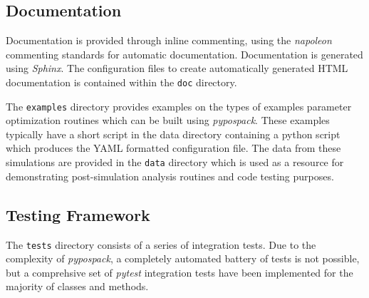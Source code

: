 \subsection{Documentation}

Documentation is provided through inline commenting, using the \emph{napoleon} commenting standards for automatic documentation.  Documentation is generated using \emph{Sphinx}.  The configuration files to create automatically generated HTML documentation is contained within the \verb|doc| directory.

The \verb|examples| directory provides examples on the types of examples parameter optimization routines which can be built using \emph{pypospack}.  These examples typically have a short script in the data directory containing a python script which produces the YAML formatted configuration file.  The data from these simulations are provided in the \verb|data| directory which is used as a resource for demonstrating post-simulation analysis routines and code testing purposes.

\subsection{Testing Framework}

The \verb|tests| directory consists of a series of integration tests.  Due to the complexity of \emph{pypospack}, a completely automated battery of tests is not possible, but a comprehsive set of \emph{pytest} integration tests have been implemented for the majority of classes and methods.
